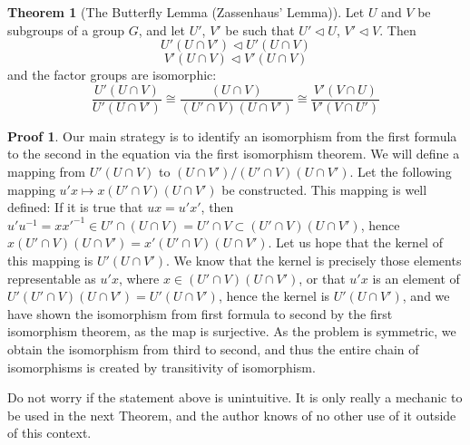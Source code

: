 \documentclass[12pt]{amsbook}
\theoremstyle{definition}
\newtheorem{theorem}{Theorem}[chapter]
\newtheorem*{prf}{Proof}
\begin{document}
\begin{theorem}[The Butterfly Lemma (Zassenhaus' Lemma)]  
    Let $U$ and $V$ be subgroups of a group $G$, and let $U'$, $V'$ be such that $U' \lhd U$, $V' \lhd V$. Then
    \[ U'(U \cap V') \lhd U'(U \cap V) \]
    \[ V'(U \cap V) \lhd V'(U \cap V) \]
    and the factor groups are isomorphic:
    \[ \frac{U'(U \cap V)}{U'(U \cap V')} \cong \frac{(U \cap V)}{(U' \cap V)(U \cap V')} \cong \frac{V'(V \cap U)}{V'(V \cap U')} \]
\end{theorem}
\begin{prf}
    Our main strategy is to identify an isomorphism from the first formula to the second in the equation via the first isomorphism theorem. We will define a mapping from $U'(U \cap V)$ to $(U \cap V')/(U' \cap V)(U \cap V')$. Let the following mapping $u'x \mapsto x(U' \cap V)(U \cap V')$ be constructed. This mapping is well defined: If it is true that $ux = u'x'$, then $u'u^{-1} = xx'^{-1} \in U' \cap (U \cap V) = U' \cap V \subset (U' \cap V)(U \cap V')$, hence $x(U' \cap V)(U \cap V') = x'(U' \cap V)(U \cap V')$. Let us hope that the kernel of this mapping is $U'(U \cap V')$. We know that the kernel is precisely those elements representable as $u'x$, where $x \in (U' \cap V)(U \cap V')$, or that $u'x$ is an element of $U'(U' \cap V)(U \cap V') = U'(U \cap V')$, hence the kernel is $U'(U \cap V')$, and we have shown the isomorphism from first formula to second by the first isomorphism theorem, as the map is surjective. As the problem is symmetric, we obtain the isomorphism from third to second, and thus the entire chain of isomorphisms is created by transitivity of isomorphism.
\end{prf}

Do not worry if the statement above is unintuitive. It is only really a mechanic to be used in the next Theorem, and the author knows of no other use of it outside of this context.
\end{document}
